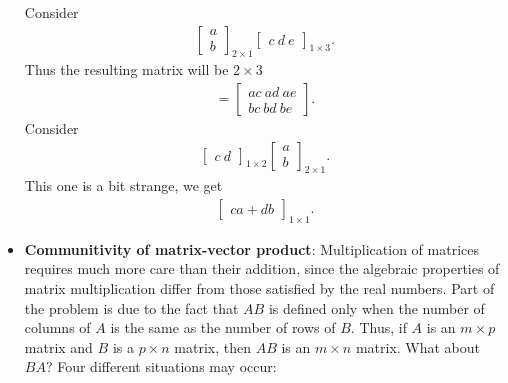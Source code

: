 \documentclass{report}
\begin{document}
\begin{itemize}
                Consider
                \begin{align*}
                    \begin{bmatrix}
                        a \\ b
                    \end{bmatrix}_{2\times1}
                    \begin{bmatrix}
                        c\ d\ e
                    \end{bmatrix}_{1\times 3}
                .\end{align*}
                Thus the resulting matrix will be $2\times 3$
                \begin{align*}
                    = \begin{bmatrix}
                        ac\ ad\ ae \\
                        bc\ bd\ be
                    \end{bmatrix}
                .\end{align*}
                \bigbreak \noindent 
                Consider
                \begin{align*}
                    \begin{bmatrix}
                        c \ d
                    \end{bmatrix}_{1\times 2}
                    \begin{bmatrix}
                        a \\ b
                    \end{bmatrix}_{2\times 1}
                .\end{align*}
                This one is a bit strange, we get
                \begin{align*}
                    \begin{bmatrix}
                        ca + db
                    \end{bmatrix}_{1\times1}
                .\end{align*}
            \item \textbf{Communitivity of matrix-vector product}:
                 Multiplication of matrices requires much more care than their addition, since the algebraic properties of matrix multiplication differ from those satisfied by the real numbers. Part of the problem is due to the fact that \(AB\) is defined only when the number of columns of \(A\) is the same as the number of rows of \(B\). Thus, if \(A\) is an \(m \times p\) matrix and \(B\) is a \(p \times n\) matrix, then \(AB\) is an \(m \times n\) matrix. What about \(BA\)? Four different situations may occur:

\end{itemize}
\end{document}
